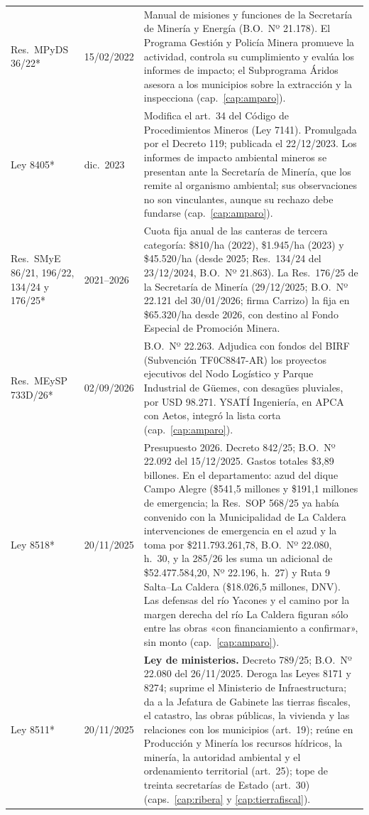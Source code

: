 \begin{longtable}{@{}p{3.2cm}p{1.9cm}p{7.9cm}@{}}
Res.\ MPyDS 36/22* & 15/02/2022 & Manual de misiones y funciones de la Secretaría de Minería y Energía (B.O.\ Nº 21.178). El Programa Gestión y Policía Minera promueve la actividad, controla su cumplimiento y evalúa los informes de impacto; el Subprograma Áridos asesora a los municipios sobre la extracción y la inspecciona (cap.\ \ref{cap:amparo}). \\
Ley 8405* & dic.\ 2023 & Modifica el art.\ 34 del Código de Procedimientos Mineros (Ley 7141). Promulgada por el Decreto 119; publicada el 22/12/2023. Los informes de impacto ambiental mineros se presentan ante la Secretaría de Minería, que los remite al organismo ambiental; sus observaciones no son vinculantes, aunque su rechazo debe fundarse (cap.\ \ref{cap:amparo}). \\
Res.\ SMyE 86/21, 196/22, 134/24 y 176/25* & 2021--2026 & Cuota fija anual de las canteras de tercera categoría: \$810/ha (2022), \$1.945/ha (2023) y \$45.520/ha (desde 2025; Res.\ 134/24 del 23/12/2024, B.O.\ Nº 21.863). La Res.\ 176/25 de la Secretaría de Minería (29/12/2025; B.O.\ Nº 22.121 del 30/01/2026; firma Carrizo) la fija en \$65.320/ha desde 2026, con destino al Fondo Especial de Promoción Minera. \\
Res.\ MEySP 733D/26* & 02/09/2026 & B.O.\ Nº 22.263. Adjudica con fondos del BIRF (Subvención TF0C8847-AR) los proyectos ejecutivos del Nodo Logístico y Parque Industrial de Güemes, con desagües pluviales, por USD 98.271. YSATÍ Ingeniería, en APCA con Aetos, integró la lista corta (cap.\ \ref{cap:amparo}). \\
Ley 8518* & 20/11/2025 & Presupuesto 2026. Decreto 842/25; B.O.\ Nº 22.092 del 15/12/2025. Gastos totales \$3,89 billones. En el departamento: azud del dique Campo Alegre (\$541,5 millones y \$191,1 millones de emergencia; la Res.\ SOP 568/25 ya había convenido con la Municipalidad de La Caldera intervenciones de emergencia en el azud y la toma por \$211.793.261,78, B.O.\ Nº 22.080, h.\ 30, y la 285/26 les suma un adicional de \$52.477.584,20, Nº 22.196, h.\ 27) y Ruta 9 Salta--La Caldera (\$18.026,5 millones, DNV). Las defensas del río Yacones y el camino por la margen derecha del río La Caldera figuran sólo entre las obras «con financiamiento a confirmar», sin monto (cap.\ \ref{cap:amparo}). \\
Ley 8511* & 20/11/2025 & \textbf{Ley de ministerios.} Decreto 789/25; B.O.\ Nº 22.080 del 26/11/2025. Deroga las Leyes 8171 y 8274; suprime el Ministerio de Infraestructura; da a la Jefatura de Gabinete las tierras fiscales, el catastro, las obras públicas, la vivienda y las relaciones con los municipios (art.\ 19); reúne en Producción y Minería los recursos hídricos, la minería, la autoridad ambiental y el ordenamiento territorial (art.\ 25); tope de treinta secretarías de Estado (art.\ 30) (caps.\ \ref{cap:ribera} y \ref{cap:tierrafiscal}). \\

\end{longtable}
